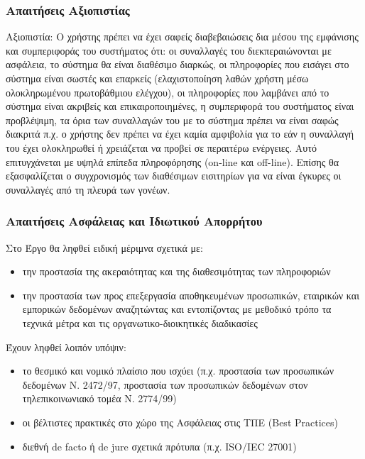\documentclass[letterpaper,6pt]{article}
\begin{document}
\subsubsection{Απαιτήσεις Αξιοπιστίας}
  Αξιοπιστία: Ο χρήστης πρέπει να έχει σαφείς διαβεβαιώσεις δια μέσου της εμφάνισης και συμπεριφοράς του συστήματος ότι: οι συναλλαγές του διεκπεραιώνονται με ασφάλεια, το σύστημα θα είναι διαθέσιμο διαρκώς, οι πληροφορίες που εισάγει στο σύστημα είναι σωστές και επαρκείς (ελαχιστοποίηση λαθών χρήστη μέσω ολοκληρωμένου πρωτοβάθμιου ελέγχου), οι πληροφορίες που λαμβάνει από το σύστημα είναι ακριβείς και επικαιροποιημένες, η συμπεριφορά του συστήματος είναι προβλέψιμη, τα όρια των συναλλαγών του με το σύστημα πρέπει να είναι σαφώς διακριτά π.χ. ο χρήστης δεν πρέπει να έχει καμία αμφιβολία για το εάν η συναλλαγή του έχει ολοκληρωθεί ή χρειάζεται να προβεί σε περαιτέρω ενέργειες. Αυτό επιτυγχάνεται με υψηλά επίπεδα πληροφόρησης (on-line και off-line). Επίσης θα εξασφαλίζεται ο συγχρονισμός των διαθέσιμων εισιτηρίων για να είναι έγκυρες οι συναλλαγές από τη πλευρά των γονέων.
  
\subsubsection{Απαιτήσεις Ασφάλειας και Ιδιωτικού Απορρήτου}

Στο Έργο θα ληφθεί ειδική μέριμνα σχετικά με: 
\begin{itemize}
  \item την προστασία της ακεραιότητας και της διαθεσιμότητας των πληροφοριών
  \item την προστασία των προς επεξεργασία αποθηκευμένων προσωπικών, εταιρικών και εμπορικών δεδομένων αναζητώντας και εντοπίζοντας με μεθοδικό τρόπο τα τεχνικά μέτρα και τις οργανωτικο-διοικητικές διαδικασίες
\end{itemize}
Έχουν ληφθεί λοιπόν υπόψιν:
\begin{itemize}
  \item το θεσμικό και νομικό πλαίσιο που ισχύει (π.χ. προστασία των προσωπικών δεδομένων Ν. 2472/97, προστασία των προσωπικών δεδομένων στον τηλεπικοινωνιακό τομέα Ν. 2774/99)
  \item οι βέλτιστες πρακτικές στο χώρο της Ασφάλειας στις ΤΠΕ (Best Practices)
  \item διεθνή de facto ή de jure σχετικά πρότυπα (π.χ. ISO/IEC 27001)
\end{itemize}
  
\end{document}
